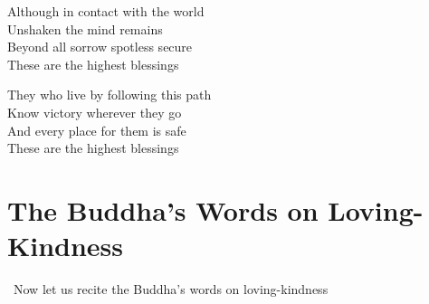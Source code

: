 \begin{english-only}
  Although in contact with the world\\
  Unshaken the mind remains\\
  Beyond all sorrow spotless secure\\
  These are the highest blessings
\end{english-only}

\begin{english-only}
  They who live by following this path\\
  Know victory wherever they go\\
  And every place for them is safe\\
  These are the highest blessings
\end{english-only}

\suttaRef{[Snp 2.4]}




\section{The Buddha's Words on Loving-Kindness}
\label{words-on-loving-kindness}

\begin{leader-english}
  \anglebracketleft\ \hspace{-0.5mm}Now let us recite the Buddha's words on loving-kindness \hspace{-0.5mm}\anglebracketright\
\end{leader-english}

